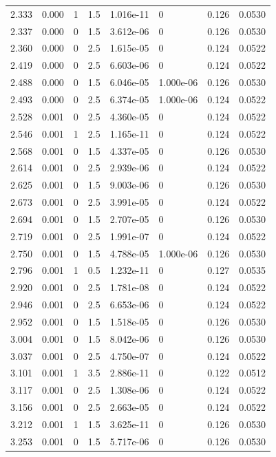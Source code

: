 \documentclass[preview]{standalone}
\begin{document}
{{{\begin{tabular}{L{1.2cm}C{1.2cm} C{0.3cm}C{0.5cm} C{1.4cm}C{1.4cm} C{1.4cm}C{1.4cm}}
  2.333  &  0.000  & 1     & 1.5 &  1.016e-11  & 0  & 0.126 &  0.0530   \\ 
  2.337  &  0.000  & 0     & 1.5 &  3.612e-06  & 0  & 0.126 &  0.0530   \\ 
  2.360  &  0.000  & 0     & 2.5 &  1.615e-05  & 0  & 0.124 &  0.0522   \\ 
  2.419  &  0.000  & 0     & 2.5 &  6.603e-06  & 0  & 0.124 &  0.0522   \\ 
  2.488  &  0.000  & 0     & 1.5 &  6.046e-05  & 1.000e-06  & 0.126 &  0.0530   \\ 
  2.493  &  0.000  & 0     & 2.5 &  6.374e-05  & 1.000e-06  & 0.124 &  0.0522   \\ 
  2.528  &  0.001  & 0     & 2.5 &  4.360e-05  & 0  & 0.124 &  0.0522   \\ 
  2.546  &  0.001  & 1     & 2.5 &  1.165e-11  & 0  & 0.124 &  0.0522   \\ 
  2.568  &  0.001  & 0     & 1.5 &  4.337e-05  & 0  & 0.126 &  0.0530   \\ 
  2.614  &  0.001  & 0     & 2.5 &  2.939e-06  & 0  & 0.124 &  0.0522   \\ 
  2.625  &  0.001  & 0     & 1.5 &  9.003e-06  & 0  & 0.126 &  0.0530   \\ 
  2.673  &  0.001  & 0     & 2.5 &  3.991e-05  & 0  & 0.124 &  0.0522   \\ 
  2.694  &  0.001  & 0     & 1.5 &  2.707e-05  & 0  & 0.126 &  0.0530   \\ 
  2.719  &  0.001  & 0     & 2.5 &  1.991e-07  & 0  & 0.124 &  0.0522   \\ 
  2.750  &  0.001  & 0     & 1.5 &  4.788e-05  & 1.000e-06  & 0.126 &  0.0530   \\ 
  2.796  &  0.001  & 1     & 0.5 &  1.232e-11  & 0  & 0.127 &  0.0535   \\ 
  2.920  &  0.001  & 0     & 2.5 &  1.781e-08  & 0  & 0.124 &  0.0522   \\ 
  2.946  &  0.001  & 0     & 2.5 &  6.653e-06  & 0  & 0.124 &  0.0522   \\ 
  2.952  &  0.001  & 0     & 1.5 &  1.518e-05  & 0  & 0.126 &  0.0530   \\ 
  3.004  &  0.001  & 0     & 1.5 &  8.042e-06  & 0  & 0.126 &  0.0530   \\ 
  3.037  &  0.001  & 0     & 2.5 &  4.750e-07  & 0  & 0.124 &  0.0522   \\ 
  3.101  &  0.001  & 1     & 3.5 &  2.886e-11  & 0  & 0.122 &  0.0512   \\ 
  3.117  &  0.001  & 0     & 2.5 &  1.308e-06  & 0  & 0.124 &  0.0522   \\ 
  3.156  &  0.001  & 0     & 2.5 &  2.663e-05  & 0  & 0.124 &  0.0522   \\ 
  3.212  &  0.001  & 1     & 1.5 &  3.625e-11  & 0  & 0.126 &  0.0530   \\ 
  3.253  &  0.001  & 0     & 1.5 &  5.717e-06  & 0  & 0.126 &  0.0530   \\ 
\hline 
\end{tabular} 

}}}
\end{document}
